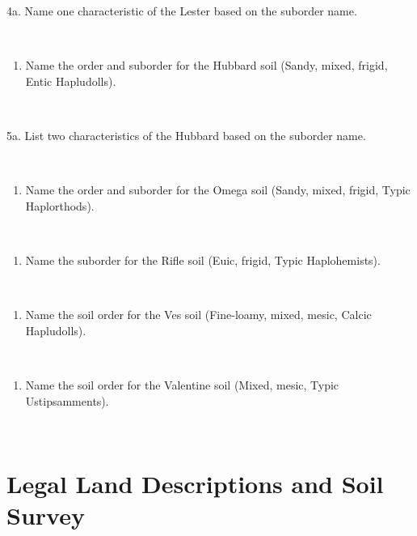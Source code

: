 \documentclass[
  letterpaper,
  twocolumn,
  portrait]{scrbook}
\providecommand{\tightlist}{%
  \setlength{\itemsep}{0pt}\setlength{\parskip}{0pt}}\usepackage{longtable,booktabs,array}
\begin{document}
4a. Name one characteristic of the Lester based on the suborder name.

~ ~ ~

\begin{enumerate}
\def\labelenumi{\arabic{enumi}.}
\setcounter{enumi}{4}
\tightlist
\item
  Name the order and suborder for the Hubbard soil (Sandy, mixed,
  frigid, Entic Hapludolls).
\end{enumerate}

~ ~ ~

5a. List two characteristics of the Hubbard based on the suborder name.

~ ~ ~

\begin{enumerate}
\def\labelenumi{\arabic{enumi}.}
\setcounter{enumi}{5}
\tightlist
\item
  Name the order and suborder for the Omega soil (Sandy, mixed, frigid,
  Typic Haplorthods).
\end{enumerate}

~ ~ ~

\begin{enumerate}
\def\labelenumi{\arabic{enumi}.}
\setcounter{enumi}{6}
\tightlist
\item
  Name the suborder for the Rifle soil (Euic, frigid, Typic
  Haplohemists).
\end{enumerate}

~ ~ ~

\begin{enumerate}
\def\labelenumi{\arabic{enumi}.}
\setcounter{enumi}{7}
\tightlist
\item
  Name the soil order for the Ves soil (Fine-loamy, mixed, mesic, Calcic
  Hapludolls).
\end{enumerate}

~ ~ ~

\begin{enumerate}
\def\labelenumi{\arabic{enumi}.}
\setcounter{enumi}{8}
\tightlist
\item
  Name the soil order for the Valentine soil (Mixed, mesic, Typic
  Ustipsamments).
\end{enumerate}

~ ~ ~


\hypertarget{legal-land-descriptions-and-soil-survey}{%
\chapter{\texorpdfstring{\textbf{Legal Land Descriptions and Soil
Survey}}{Legal Land Descriptions and Soil Survey}}\label{legal-land-descriptions-and-soil-survey}}
\end{document}
